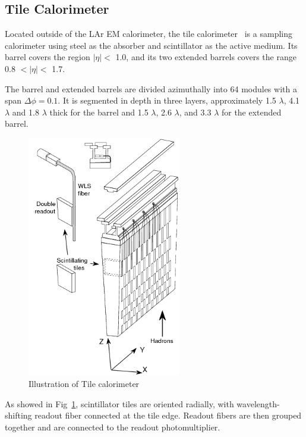 \subsection{Tile Calorimeter}
\par Located outside of the LAr EM calorimeter, the tile calorimeter~\cite{CERN-LHCC-96-042} is a sampling calorimeter using steel 
as the absorber and scintillator as the active medium. Its barrel covers the region $|\eta| <$ 1.0, and its two extended barrels covers the range 0.8 $< |\eta| <$ 1.7.
\par The barrel and extended barrels are divided azimuthally into 64 modules with a span $\Delta \phi = 0.1$. 
It is segmented in depth in three layers, 
approximately 1.5 $\lambda$, 4.1 $\lambda$ and 1.8 $\lambda$ thick for the barrel and 1.5 $\lambda$, 2.6 $\lambda$, and 3.3 $\lambda$ 
for the extended barrel. 
\begin{figure}[htbp!]
 \begin{center}
 \includegraphics[width=0.6\textwidth]{chapters/c4/figures/tile}

 \end{center}
 \caption{Illustration of Tile calorimeter}
 \label{fig:Tile}
\end{figure}
\par As showed in Fig~\ref{fig:Tile}, scintillator tiles are oriented radially, with wavelength-shifting readout fiber connected at the tile edge. 
Readout fibers are then grouped together and are connected to the readout photomultiplier.

